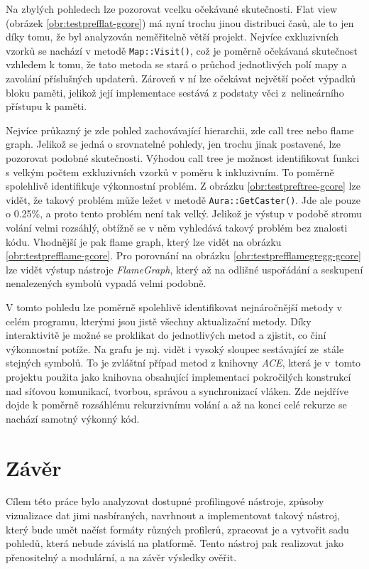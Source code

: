 \documentclass[czech,BP]{thesiskiv}
\begin{document}
Na zbylých pohledech lze pozorovat vcelku očekávané skutečnosti. Flat view (obrázek \ref{obr:testprefflat-gcore}) má nyní trochu jinou distribuci časů, ale to jen díky tomu, že byl analyzován neměřitelně větší projekt. Nejvíce exkluzivních vzorků se nachází v metodě \texttt{Map::Visit()}, což je poměrně očekávaná skutečnost vzhledem k tomu, že tato metoda se stará o průchod jednotlivých polí mapy a zavolání příslušných updaterů. Zároveň v ní lze očekávat největší počet výpadků bloku paměti, jelikož její implementace sestává z podstaty věci z~nelineárního přístupu k paměti.

Nejvíce průkazný je zde pohled zachovávající hierarchii, zde call tree nebo flame graph. Jelikož se jedná o srovnatelné pohledy, jen trochu jinak postavené, lze pozorovat podobné skutečnosti. Výhodou call tree je možnost identifikovat funkci s velkým počtem exkluzivních vzorků v poměru k inkluzivním. To poměrně spolehlivě identifikuje výkonnostní problém. Z obrázku \ref{obr:testpreftree-gcore} lze vidět, že takový problém může ležet v metodě \texttt{Aura::GetCaster()}. Jde ale pouze o 0.25\%, a proto tento problém není tak velký. Jelikož je výstup v podobě stromu volání velmi rozsáhlý, obtížně se v něm vyhledává takový problém bez znalosti kódu. Vhodnější je pak flame graph, který lze vidět na obrázku \ref{obr:testprefflame-gcore}. Pro porovnání na obrázku \ref{obr:testprefflamegregg-gcore} lze vidět výstup nástroje \emph{FlameGraph}, který až na odlišné uspořádání a seskupení nenalezených symbolů vypadá velmi podobně.

V tomto pohledu lze poměrně spolehlivě identifikovat nejnáročnější metody v celém programu, kterými jsou jistě všechny aktualizační metody. Díky interaktivitě je možné se proklikat do jednotlivých metod a zjistit, co činí výkonnostní potíže. Na grafu je mj. vidět i vysoký sloupec sestávající ze~stále stejných symbolů. To je zvláštní případ metod z knihovny \emph{ACE}, která je v~tomto projektu použita jako knihovna obsahující implementaci pokročilých konstrukcí nad síťovou komunikací, tvorbou, správou a synchronizací vláken. Zde nejdříve dojde k poměrně rozsáhlému rekurzivnímu volání a až na konci celé rekurze se nachází samotný výkonný kód.




\newpage

\chapter{Závěr}

Cílem této práce bylo analyzovat dostupné profilingové nástroje, způsoby vizualizace dat jimi nasbíraných, navrhnout a implementovat takový nástroj, který bude umět načíst formáty různých profilerů, zpracovat je a vytvořit sadu pohledů, která nebude závislá na platformě. Tento nástroj pak realizovat jako přenositelný a modulární, a na závěr výsledky ověřit.
\end{document}
